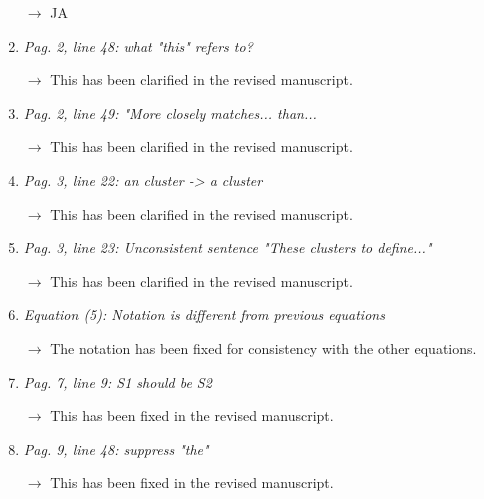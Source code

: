\documentclass[10pt]{article}
\begin{document}
\begin{enumerate}
$\rightarrow$ JA

\item \emph{Pag. 2, line 48: what "this" refers to?}

$\rightarrow$
This has been clarified in the revised manuscript.

\item \emph{Pag. 2, line 49: "More closely matches... than...}

$\rightarrow$
This has been clarified in the revised manuscript.

\item \emph{Pag. 3, line 22: an cluster -> a cluster}

$\rightarrow$
This has been clarified in the revised manuscript.

\item \emph{Pag. 3, line 23: Unconsistent sentence "These clusters to define..."}

$\rightarrow$
This has been clarified in the revised manuscript.

\item \emph{Equation (5): Notation is different from previous equations}

$\rightarrow$
The notation has been fixed for consistency with the other equations.

\item \emph{Pag. 7, line 9: S1 should be S2}

$\rightarrow$
This has been fixed in the revised manuscript.

\item \emph{Pag. 9, line 48: suppress "the"}

$\rightarrow$
This has been fixed in the revised manuscript.

\end{enumerate}
\end{document}
